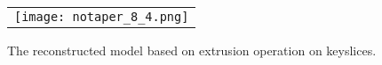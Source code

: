 %
%
%

\begin{figure}[htbp]
\begin{center}
\begin{tabular}{c}
\texttt{[image: notaper\_8\_4.png]}
\end{tabular}
\end{center}
\caption{ The reconstructed model based on extrusion operation on keyslices. }
\label{fig:DXF_notaper_model}
\end{figure}

